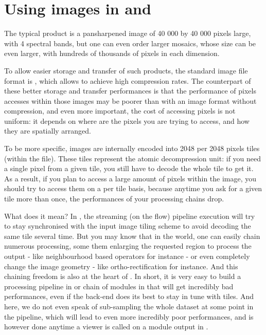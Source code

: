 \newpage
\section{Using \phr images in \app and \mont}\label{sec:pleiades}

The typical \phr product is a pansharpened image of 40 000 by 40
000 pixels large, with 4 spectral bands, but one can even order larger
mosaics, whose size can be even larger, with hundreds of thousands of
pixels in each dimension.

To allow easier storage and transfer of such products, the standard
image file format is \jpg, which allows to achieve high
compression rates. The counterpart of these better storage and
transfer performances is that the performance of pixels accesses
within those images may be poorer than with an image format without
compression, and even more important, the cost of accessing pixels is
not uniform: it depends on where are the pixels you are trying to
access, and how they are spatially arranged.

To be more specific, \phr images are internally encoded into 2048
per 2048 pixels tiles (within the \jpg file). These tiles
represent the atomic decompression unit: if you need a single pixel
from a given tile, you still have to decode the whole tile to get
it. As a result, if you plan to access a large amount of pixels within
the image, you should try to access them on a per tile basis, because
anytime you ask for a given tile more than once, the performances of
your processing chains drop.

What does it mean? In \otb, the streaming (on the flow) pipeline
execution will try to stay synchronised with the input image tiling
scheme to avoid decoding the same tile several time. But you may know
that in the \otb world, one can easily chain numerous processing, some
them enlarging the requested region to process the output - like
neighbourhood based operators for instance - or even completely change
the image geometry - like ortho-rectification for instance. And this
chaining freedom is also at the heart of \mont. In short, it is
very easy to build a processing pipeline in \otb or chain of modules in
\mont that will get incredibly bad performances, even if the \otb
back-end does its best to stay in tune with tiles. And here, we do not
even speak of sub-sampling the whole dataset at some point in the
pipeline, which will lead to even more incredibly poor performances,
and is however done anytime a viewer is called on a module output in
\mont.


